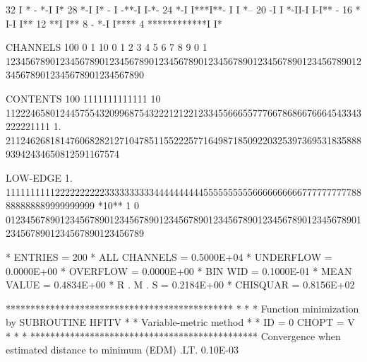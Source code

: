 \begin{Listing}
       32                          I                       *    -    *-I                             I*
       28                        *-I                       I* - I -**-I                              I-*-
       24                       *-I                         I***I**- I                                I *--
       20                      -I                             I *-II-I                                I-I** -
       16                      *                              I-I                                         I**
       12                    **I                                                                            I**
        8                 - *-I                                                                               I****
        4       ************I                                                                                     I*
 
 CHANNELS 100   0                                                                                                  1   
           10   0        1         2         3         4         5         6         7         8         9         0   
            1   1234567890123456789012345678901234567890123456789012345678901234567890123456789012345678901234567890   
 
 CONTENTS 100                          1111111111111                                                                
           10                 112224658012445755432099687543222121221233455666557776678686676664543343222221111     
            1.       21124626818147606828212710478511552225771649871850922032539736953183588893942434650812591167574
 
 LOW-EDGE   1.            111111111122222222223333333333444444444455555555556666666666777777777788888888889999999999
 *10**  1   0   0123456789012345678901234567890123456789012345678901234567890123456789012345678901234567890123456789
 
 * ENTRIES =        200      * ALL CHANNELS = 0.5000E+04      * UNDERFLOW = 0.0000E+00      * OVERFLOW = 0.0000E+00
 * BIN WID = 0.1000E-01      * MEAN VALUE   = 0.4834E+00      * R . M . S = 0.2184E+00
 * CHISQUAR  =  0.8156E+02
\newpage
{\scriptsize
     **********************************************
     *                                            *
     * Function minimization by SUBROUTINE HFITV  *
     * Variable-metric method                     *
     * ID =          0  CHOPT = V                 *
     *                                            *
     **********************************************
 Convergence when estimated distance to minimum (EDM) .LT.  0.10E-03

}
\end{Listing}
